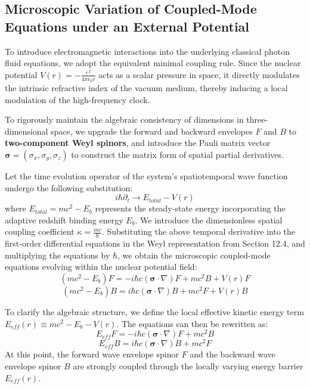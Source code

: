 \documentclass[12pt, a4paper]{article}
\begin{document}
\subsection{Microscopic Variation of Coupled-Mode Equations under an External Potential}

To introduce electromagnetic interactions into the underlying classical photon fluid equations, we adopt the equivalent minimal coupling rule. Since the nuclear potential $V(r) = -\frac{e^2}{4\pi\epsilon_0 r}$ acts as a scalar pressure in space, it directly modulates the intrinsic refractive index of the vacuum medium, thereby inducing a local modulation of the high-frequency clock.

To rigorously maintain the algebraic consistency of dimensions in three-dimensional space, we upgrade the forward and backward envelopes $F$ and $B$ to \textbf{two-component Weyl spinors}, and introduce the Pauli matrix vector $\boldsymbol{\sigma} = (\sigma_x, \sigma_y, \sigma_z)$ to construct the matrix form of spatial partial derivatives.

Let the time evolution operator of the system's spatiotemporal wave function undergo the following substitution:
\begin{equation}
    i\hbar\partial_t \to E_{total} - V(r)
\end{equation}
where $E_{total} = mc^2 - E_b$ represents the steady-state energy incorporating the adaptive redshift binding energy $E_b$. We introduce the dimensionless spatial coupling coefficient $\kappa = \frac{mc}{\hbar}$. Substituting the above temporal derivative into the first-order differential equations in the Weyl representation from Section 12.4, and multiplying the equations by $\hbar$, we obtain the microscopic coupled-mode equations evolving within the nuclear potential field:
\begin{equation}
    (mc^2 - E_b) F = -i\hbar c (\boldsymbol{\sigma} \cdot \nabla) F + mc^2 B + V(r) F
\end{equation}
\begin{equation}
    (mc^2 - E_b) B = i\hbar c (\boldsymbol{\sigma} \cdot \nabla) B + mc^2 F + V(r) B
\end{equation}

To clarify the algebraic structure, we define the local effective kinetic energy term $E_{eff}(r) \equiv mc^2 - E_b - V(r)$. The equations can then be rewritten as:
\begin{equation}
    E_{eff} F = -i\hbar c (\boldsymbol{\sigma} \cdot \nabla) F + mc^2 B \label{eq:micro_CME_F}
\end{equation}
\begin{equation}
    E_{eff} B = i\hbar c (\boldsymbol{\sigma} \cdot \nabla) B + mc^2 F \label{eq:micro_CME_B}
\end{equation}
At this point, the forward wave envelope spinor $F$ and the backward wave envelope spinor $B$ are strongly coupled through the locally varying energy barrier $E_{eff}(r)$.
\end{document}
